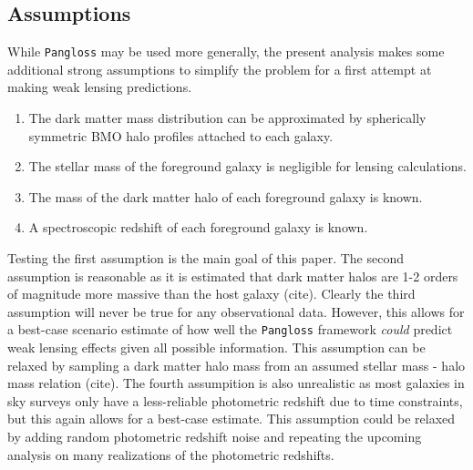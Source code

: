 \documentclass[%
 reprint,
 amsmath,amssymb,
 aps,
]{revtex4-1}
\begin{document}
\subsection*{Assumptions}
While \texttt{Pangloss} may be used more generally, the present analysis makes some additional strong assumptions to simplify the problem for a first attempt at making weak lensing predictions.

\begin{enumerate}
\item The dark matter mass distribution can be approximated by spherically symmetric BMO halo profiles attached to each galaxy.
\item The stellar mass of the foreground galaxy is negligible for lensing calculations.
\item The mass of the dark matter halo of each foreground galaxy is known.
\item A spectroscopic redshift of each foreground galaxy is known.
\end{enumerate}

Testing the first assumption is the main goal of this paper. The second assumption is reasonable as it is estimated that dark matter halos are 1-2 orders of magnitude more massive than the host galaxy (cite). Clearly the third assumption will never be true for any observational data. However, this allows for a best-case scenario estimate of how well the \texttt{Pangloss} framework \textit{could} predict weak lensing effects given all possible information. This assumption can be relaxed by sampling a dark matter halo mass from an assumed stellar mass - halo mass relation (cite). The fourth assumpition is also unrealistic as most galaxies in sky surveys only have a less-reliable photometric redshift due to time constraints, but this again allows for a best-case estimate. This assumption could be relaxed by adding random photometric redshift noise and repeating the upcoming analysis on many realizations of the photometric redshifts.
\end{document}
